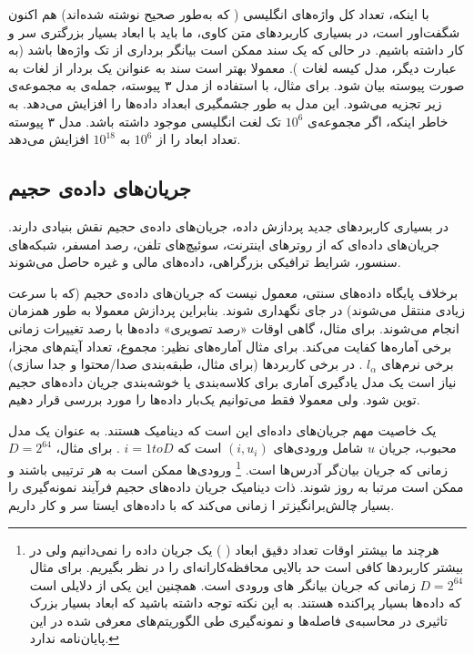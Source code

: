 با اینکه، تعداد کل واژه‌های انگلیسی ( که به‌طور صحیح نوشته شده‌اند) هم اکنون شگفت‌اور است، در بسیاری کاربردهای متن کاوی، ما باید با ابعاد بسیار بزرگتری سر و کار داشته باشیم. در حالی که یک سند ممکن است بیانگر برداری از تک واژه‌ها باشد (به عبارت دیگر، مدل کیسه لغات%
). معمولا بهتر است سند به عنوانن یک بردار از لغات به صورت 
پیوسته %
\cite{litez34}
بیان شود. برای مثال، با استفاده از مدل ۳ پیوسته، جمله‌ی
به مجموعه‌ی زیر تجزیه می‌شود. 
این مدل به طور جشمگیری ابعداد داده‌ها را افزایش می‌دهد. به خاطر اینکه، اگر مجموعه‌ی 
$10^6$
تک لغت انگلیسی موجود داشته باشد. مدل ۳ پیوسته تعداد ابعاد را از 
$10^6$
به 
$10^{18}$
افزایش می‌دهد.

\subsection{
جریان‌های داده‌ی حجیم
}
در بسیاری کاربردهای جدید پردازش داده، جریان‌های داده‌ی حجیم نقش بنیادی دارند. جریان‌های داده‌ای که از روترهای اینترنت، سوئیچ‌های تلفن، رصد امسفر، شبکه‌های سنسور، شرایط ترافیکی بزرگراهی، داده‌های مالی و غیره 
\cite{litez5, litez141, litez49, litez19, litez96, litez69, litez91}
حاصل می‌شوند.

برخلاف پایگاه‌ داده‌های سنتی، معمول نیست که جریان‌های داده‌ی حجیم (که با سرعت زیادی منتقل می‌شوند) در جای نگهداری شوند. بنابراین پردازش معمولا به طور همزمان انجام می‌شوند. برای مثال، گاهی اوقات «رصد تصویری» داده‌ها با رصد تغییرات زمانی برخی آماره‌ها کفایت می‌کند. برای مثال آماره‌های نظیر: مجموع، تعداد آیتم‌های مجزا، برخی نرم‌های 
$l_\alpha$
. در برخی کاربردها (برای مثال، طبقه‌بندی صدا/محتوا و جدا سازی) نیاز است یک مدل یادگیری آماری برای کلاسه‌بندی%
یا خوشه‌بندی%
جریان داده‌های حجیم توین شود. ولی معمولا فقط می‌توانیم یک‌بار داده‌ها را مورد بررسی قرار دهیم.

یک خاصیت مهم جریان‌های داده‌ای این است که دینامیک هستند. به عنوان یک مدل محبوب، جریان 
$u$
شامل ورودی‌های 
$(i, u_i)$
است که 
$i = 1 to D$
. برای مثال،
$D = 2^{64}$
زمانی که جریان بیان‌گر 
آدرس‌ها است.
\footnote{
هرچند ما بیشتر اوقات تعداد دقیق ابعاد (
) یک جریان داده را نمی‌دانیم ولی در بیشتر کاربردها کافی است حد بالایی محافظه‌کارانه‌ای را در نظر بگیریم. برای مثال 
$D = 2^{64}$
زمانی که جریان بیانگر 
های ورودی است. همچنین این یکی از دلایلی است که داده‌ها بسیار پراکنده هستند. به این نکته توجه داشته باشید که ابعاد بسیار بزرک تاثیری در محاسبه‌ی فاصله‌ها و نمونه‌گیری طی الگوریتم‌های معرفی شده در این پایان‌نامه ندارد.
}
ورودی‌ها ممکن است به هر ترتیبی باشند و ممکن است مرتبا به روز شوند. ذات دینامیک جریان داده‌های حجیم فرآیند نمونه‌گیری را بسیار چالش‌برانگیزتر ا زمانی ‌می‌کند که با داده‌های ایستا سر و کار داریم.

